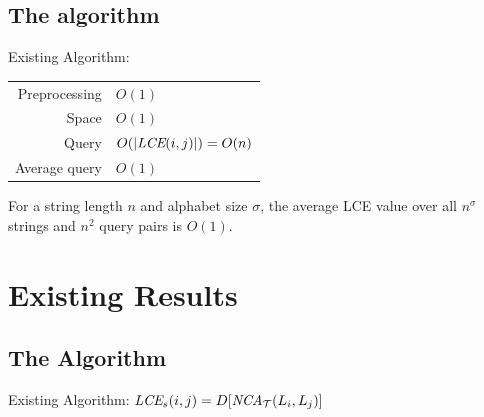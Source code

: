 \documentclass{beamer}
\begin{document}
\subsection{The  algorithm}
\begin{frame}{Existing Algorithm: }
    \begin{tabular}{r l}
        Preprocessing & $O(1)$ \\
        Space & $O(1)$ \\
        Query & $O(|\textit{LCE}(i,j)|)=O(n)$ \\
        Average query & $O(1)$ \\
    \end{tabular}

    \vspace{1cm}
    For a string length $n$ and alphabet size $\sigma$, the average LCE value over all $n^\sigma$ strings and $n^2$ query pairs is $O(1)$.
\end{frame}

\section{Existing Results}
\subsection{The  Algorithm}
\begin{frame}{Existing Algorithm: }
    $\textit{LCE}_s(i,j) = D[\textit{NCA}_\mathcal{T}(L_i,L_j)]$
\end{frame}
\end{document}
